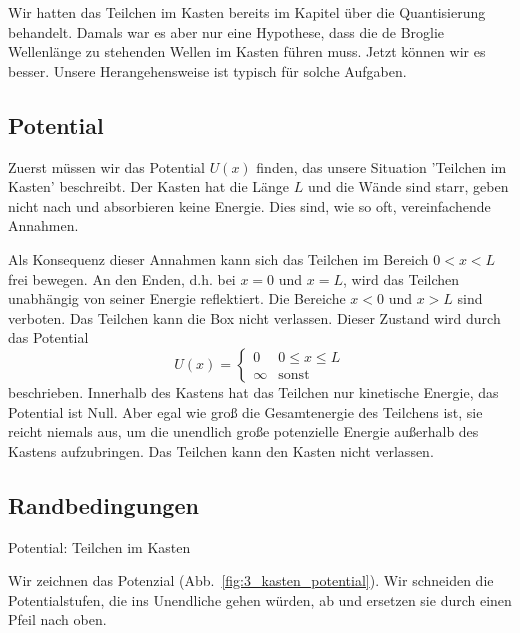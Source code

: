 Wir hatten das Teilchen im Kasten bereits im Kapitel über die Quantisierung behandelt. Damals war es aber nur eine Hypothese, dass die de Broglie Wellenlänge zu stehenden Wellen im Kasten führen muss. Jetzt können wir es besser. Unsere Herangehensweise ist typisch für solche Aufgaben.


\subsection{Potential}

Zuerst müssen wir das Potential $U(x)$ finden, das unsere Situation 'Teilchen im Kasten' beschreibt. Der Kasten hat die Länge $L$ und die Wände sind starr, geben nicht nach und absorbieren keine Energie. Dies sind, wie so oft, vereinfachende Annahmen.

Als Konsequenz dieser Annahmen kann sich das Teilchen im Bereich $0 < x < L$ frei bewegen. An den Enden, d.h. bei $x=0$ und $x=L$, wird das Teilchen unabhängig von seiner Energie reflektiert. Die Bereiche $x<0$ und $x>L$ sind verboten. Das Teilchen kann die Box nicht verlassen. Dieser Zustand wird durch das Potential 
\begin{equation}
    U(x) = \left\{ 
        \begin{matrix}
            0 & 0 \le x \le L \\
            \infty & \text{sonst}
        \end{matrix}
    \right.
\end{equation}
beschrieben. Innerhalb des Kastens hat das Teilchen nur kinetische Energie, das Potential ist Null. Aber egal wie groß die Gesamtenergie des Teilchens ist, sie reicht niemals aus, um die unendlich große potenzielle Energie außerhalb des Kastens aufzubringen. Das Teilchen kann den Kasten nicht verlassen.


\subsection{Randbedingungen}

\begin{marginfigure}
    \caption{Potential: Teilchen im Kasten}
    \label{fig:3_kasten_potential}
\end{marginfigure}

Wir zeichnen das Potenzial (Abb.~\ref{fig:3_kasten_potential}). Wir schneiden die Potentialstufen, die ins Unendliche gehen würden, ab und ersetzen sie durch einen Pfeil nach oben.

